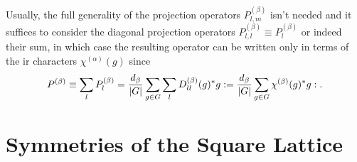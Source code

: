 Usually, the full generality of the
projection operators $P^{(\beta)}_{l,m}$ isn't needed and it suffices to consider the diagonal projection operators
$P^{(\beta)}_{l,l} \equiv P^{(\beta)}_l$ or indeed their sum, in which case the resulting operator can be written only in terms of the \ac{ir} characters
$\chi^{(\alpha)}(g)$ since
\begin{equation}
    \label{eq:Group:Irr:Pro:charPro}
    P^{(\beta)}\equiv\sum_lP^{(\beta)}_l = \frac{d_\beta}{\lvert G \rvert}\sum_{g\in G}\sum_lD_{ll}^{(\beta)}(g)^\ast g: = \frac{d_\beta}{\lvert G \rvert}\sum_{g\in G}\chi^{(\beta)}(g)^\ast g:.
\end{equation}


\section{Symmetries of the Square Lattice}
\label{sec:Group:Symm}

